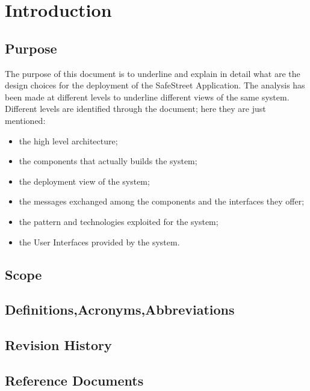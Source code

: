 \documentclass[a4paper]{report}
\begin{document}
\tableofcontents
\listoffigures
\begingroup
\let\clearpage\relax %
\listoftables
\endgroup
\restoregeometry

\chapter{Introduction}
\section{Purpose}

The purpose of this document is to underline and explain in detail what are the design choices for the deployment of the SafeStreet Application.  The analysis has been made at different levels to underline different views of the same system.
Different levels are identified through the document; here they are just mentioned:
\begin{itemize}
\item the high level architecture;
\item the components that actually builds the system;
\item the deployment view of the system;
\item the messages exchanged among the components and the interfaces they offer;
\item the pattern and technologies exploited for the system;
\item the User Interfaces provided by the system.
\end{itemize}

\section{Scope}

\section{Definitions,Acronyms,Abbreviations}


\section{Revision History}
\section{Reference Documents}
\end{document}

